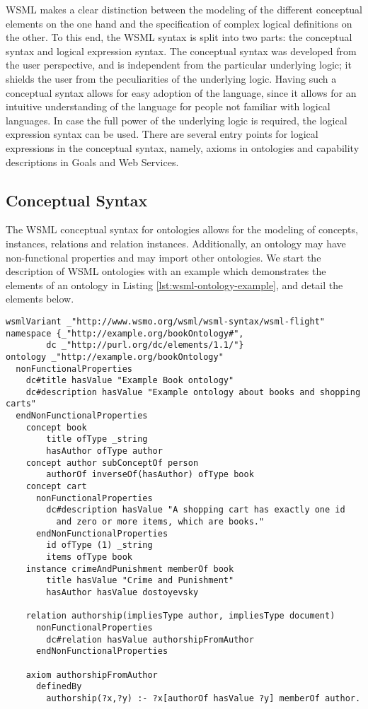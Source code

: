 WSML makes a clear distinction between the modeling of the different
conceptual elements on the one hand and the specification of complex
logical definitions on the other. To this end, the WSML syntax is
split into two parts: the conceptual syntax and logical expression
syntax. The conceptual syntax was developed from the user
perspective, and is independent from the particular underlying
logic; it shields the user from the peculiarities of the underlying
logic. Having such a conceptual syntax allows for easy adoption of
the language, since it allows for an intuitive understanding of the
language for people not familiar with logical languages. In case the
full power of the underlying logic is required, the logical
expression syntax can be used. There are several entry points for
logical expressions in the conceptual syntax, namely, axioms in
ontologies and capability descriptions in Goals and Web Services.

\subsection{Conceptual Syntax}
\label{sec:conceptual-syntax}

The WSML conceptual syntax for ontologies allows for the modeling of
concepts, instances, relations and relation instances. Additionally,
an ontology may have non-functional properties and may import other
ontologies. We start the description of WSML ontologies with an
example which demonstrates the elements of an ontology in Listing
\ref{lst:wsml-ontology-example}, and detail the elements below.

\begin{lstlisting}[label=lst:wsml-ontology-example,style=wsml,caption={An
    Example WSML Ontology}]
wsmlVariant _"http://www.wsmo.org/wsml/wsml-syntax/wsml-flight"
namespace {_"http://example.org/bookOntology#",
        dc _"http://purl.org/dc/elements/1.1/"}
ontology _"http://example.org/bookOntology"
  nonFunctionalProperties
    dc#title hasValue "Example Book ontology"
    dc#description hasValue "Example ontology about books and shopping carts"
  endNonFunctionalProperties
    concept book
        title ofType _string
        hasAuthor ofType author
    concept author subConceptOf person
        authorOf inverseOf(hasAuthor) ofType book
    concept cart
      nonFunctionalProperties
        dc#description hasValue "A shopping cart has exactly one id
          and zero or more items, which are books."
      endNonFunctionalProperties
        id ofType (1) _string
        items ofType book
    instance crimeAndPunishment memberOf book
        title hasValue "Crime and Punishment"
        hasAuthor hasValue dostoyevsky

    relation authorship(impliesType author, impliesType document)
      nonFunctionalProperties
        dc#relation hasValue authorshipFromAuthor
      endNonFunctionalProperties

    axiom authorshipFromAuthor
      definedBy
        authorship(?x,?y) :- ?x[authorOf hasValue ?y] memberOf author.
\end{lstlisting}

